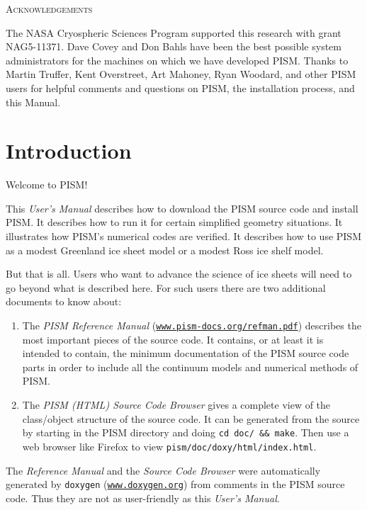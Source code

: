 \documentclass[11pt,final]{amsart}
\renewcommand{\t}[1]{\texttt{#1}}
\begin{document}
\centerline{\textsc{Acknowledgements}}
\bigskip

The NASA Cryospheric Sciences Program supported this research with grant NAG5-11371.  Dave Covey and Don Bahls have been the best possible system administrators for the machines on which we have developed PISM.  Thanks to Martin Truffer, Kent Overstreet, Art Mahoney, Ryan Woodard, and other PISM users for helpful comments and questions on PISM, the installation process, and this Manual.

\newpage
\setcounter{tocdepth}{2}
\tableofcontents


\newpage
\section{Introduction}\label{sect:intro}

Welcome to PISM!

This \emph{User's Manual} describes how to download the PISM source code and install PISM.  It describes how to run it for certain simplified geometry situations.  It illustrates how PISM's numerical codes are verified.  It describes how to use PISM as a modest Greenland ice sheet model or a modest Ross ice shelf model.

But that is all.  Users who want to advance the science of ice sheets will need to go beyond what is described here.  For such users there are two additional documents to know about:
\begin{enumerate}
 \item  The \emph{PISM Reference Manual} (\href{http://www.pism-docs.org/refman.pdf}{\t{www.pism-docs.org/refman.pdf}})
describes the most important pieces of the source code.  It contains, or at least it is intended to contain, the minimum documentation of the PISM source code parts in order to include all the continuum models and numerical methods of PISM.
 \item  The \emph{PISM (HTML) Source Code Browser} gives a complete view of the class/object structure of the source code.  It can be generated from the source by starting in the PISM directory and doing \verb|cd doc/ && make|. Then use a web browser like Firefox to view \verb|pism/doc/doxy/html/index.html|.
\end{enumerate}
The \emph{Reference Manual} and the \emph{Source Code Browser} were automatically generated by \verb|doxygen| (\href{http://www.doxygen.org/}{\t{www.doxygen.org}}) from comments in the PISM source code.  Thus they are not as user-friendly as this \emph{User's Manual}.
\end{document}
